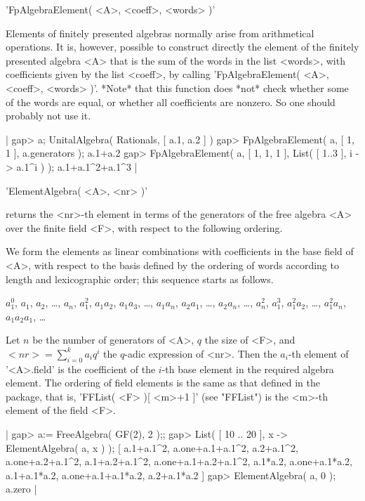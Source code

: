 \vspace{5mm}

'FpAlgebraElement( <A>, <coeff>, <words> )'

Elements of finitely presented algebras normally arise from arithmetical
operations.  It is, however, possible to construct directly the element
of the finitely presented algebra <A> that is the sum of the words in the
list <words>, with coefficients given by the list <coeff>, by calling
'FpAlgebraElement( <A>, <coeff>, <words> )'.  *Note* that this function
does *not* check whether some of the words are equal, or whether all
coefficients are nonzero.  So one should probably not use it.

|    gap> a;
    UnitalAlgebra( Rationals, [ a.1, a.2 ] )
    gap> FpAlgebraElement( a, [ 1, 1 ], a.generators );
    a.1+a.2
    gap> FpAlgebraElement( a, [ 1, 1, 1 ], List( [ 1..3 ], i -> a.1^i ) );
    a.1+a.1^2+a.1^3 |


'ElementAlgebra( <A>, <nr> )'

returns the <nr>-th element in terms of the generators of the free algebra
<A> over the finite field <F>, with respect to the following ordering.

We form the elements as linear combinations with coefficients in the base
field of <A>, with respect to the basis defined by the ordering of words
according to length and lexicographic order; this sequence starts as follows.

$a_1^0$, $a_1$, $a_2$, \ldots, $a_n$, $a_1^2$, $a_1 a_2$, $a_1 a_3$, \ldots,
$a_1 a_n$, $a_2 a_1$, \ldots, $a_2 a_n$, \ldots, $a_n^2$, $a_1^3$,
$a_1^2 a_2$, \ldots, $a_1^2 a_n$, $a_1 a_2 a_1$, \ldots

Let $n$ be the number of generators of <A>, $q$ the size of <F>,
and $<nr> = \sum_{i=0}^k a_i q^i$ the $q$-adic expression of <nr>.
Then the $a_i$-th element of '<A>.field' is the coefficient of the
$i$-th base element in the required algebra element.
The ordering of field elements is the same as that defined in the
{\MeatAxe} package, that is, 'FFList( <F> )[ <m>+1 ]' (see "FFList") is
the <m>-th element of the field <F>.

|    gap> a:= FreeAlgebra( GF(2), 2 );;
    gap> List( [ 10 .. 20 ], x -> ElementAlgebra( a, x ) );
    [ a.1+a.1^2, a.one+a.1+a.1^2, a.2+a.1^2, a.one+a.2+a.1^2, 
      a.1+a.2+a.1^2, a.one+a.1+a.2+a.1^2, a.1*a.2, a.one+a.1*a.2, 
      a.1+a.1*a.2, a.one+a.1+a.1*a.2, a.2+a.1*a.2 ]
    gap> ElementAlgebra( a, 0 );
    a.zero |


